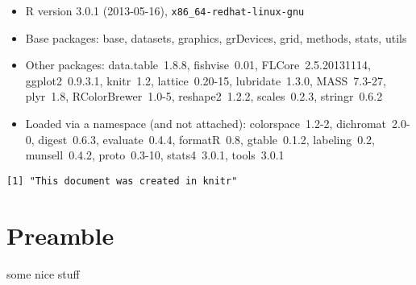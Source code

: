 \documentclass[a4paper]{article}
\begin{document}
\begin{itemize}\raggedright
  \item R version 3.0.1 (2013-05-16), \verb|x86_64-redhat-linux-gnu|
  \item Base packages: base, datasets, graphics, grDevices, grid, methods,
    stats, utils
  \item Other packages: data.table~1.8.8, fishvise~0.01, FLCore~2.5.20131114,
    ggplot2~0.9.3.1, knitr~1.2, lattice~0.20-15, lubridate~1.3.0, MASS~7.3-27,
    plyr~1.8, RColorBrewer~1.0-5, reshape2~1.2.2, scales~0.2.3, stringr~0.6.2
  \item Loaded via a namespace (and not attached): colorspace~1.2-2,
    dichromat~2.0-0, digest~0.6.3, evaluate~0.4.4, formatR~0.8, gtable~0.1.2,
    labeling~0.2, munsell~0.4.2, proto~0.3-10, stats4~3.0.1, tools~3.0.1
\end{itemize}



\begin{knitrout}
\color{fgcolor}\begin{kframe}
\begin{verbatim}
[1] "This document was created in knitr"
\end{verbatim}
\end{kframe}
\end{knitrout}

\newpage{}
\tableofcontents{}
\newpage{}

\section{Preamble}
some nice stuff
\end{document}
